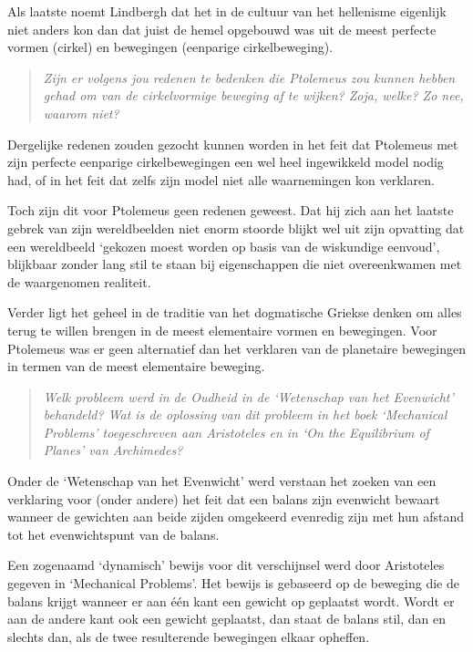 \documentclass[a4paper,11pt]{article}
\begin{document}
Als laatste noemt Lindbergh dat het in de cultuur van het hellenisme eigenlijk
niet anders kon dan dat juist de hemel opgebouwd was uit de meest perfecte
vormen (cirkel) en bewegingen (eenparige cirkelbeweging).


\begin{quote}
\emph{Zijn er volgens jou redenen te bedenken die Ptolemeus zou kunnen hebben
  gehad om van de cirkelvormige beweging af te wijken? Zoja, welke? Zo nee,
  waarom niet?}
\end{quote}


Dergelijke redenen zouden gezocht kunnen worden in het feit dat Ptolemeus met
zijn perfecte eenparige cirkelbewegingen een wel heel ingewikkeld model nodig
had, of in het feit dat zelfs zijn model niet alle waarnemingen kon
verklaren.

Toch zijn dit voor Ptolemeus geen redenen geweest. Dat hij zich aan het
laatste gebrek van zijn wereldbeelden niet enorm stoorde blijkt wel uit zijn
opvatting dat een wereldbeeld `gekozen moest worden op basis van de wiskundige
eenvoud', blijkbaar zonder lang stil te staan bij eigenschappen die niet
overeenkwamen met de waargenomen realiteit.

Verder ligt het geheel in de traditie van het dogmatische Griekse denken om
alles terug te willen brengen in de meest elementaire vormen en
bewegingen. Voor Ptolemeus was er geen alternatief dan het verklaren van de
planetaire bewegingen in termen van de meest elementaire beweging.


\begin{quote}
\emph{Welk probleem werd in de Oudheid in de `Wetenschap van het Evenwicht'
  behandeld? Wat is de oplossing van dit probleem in het boek `Mechanical
  Problems' toegeschreven aan Aristoteles en in `On the Equilibrium of Planes'
  van Archimedes?}
\end{quote}


Onder de `Wetenschap van het Evenwicht' werd verstaan het zoeken van een
verklaring voor (onder andere) het feit dat een balans zijn evenwicht bewaart
wanneer de gewichten aan beide zijden omgekeerd evenredig zijn met hun afstand
tot het evenwichtspunt van de balans.

Een zogenaamd `dynamisch' bewijs voor dit verschijnsel werd door Aristoteles
gegeven in `Mechanical Problems'. Het bewijs is gebaseerd op de beweging die
de balans krijgt wanneer er aan \'e\'en kant een gewicht op geplaatst
wordt. Wordt er aan de andere kant ook een gewicht geplaatst, dan staat de
balans stil, dan en slechts dan, als de twee resulterende bewegingen elkaar
opheffen.
\end{document}

